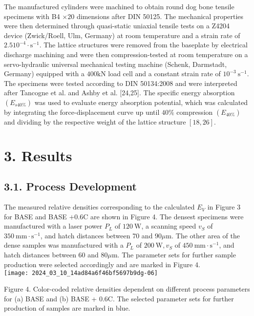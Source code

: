 \documentclass[10pt]{article}
\begin{document}
The manufactured cylinders were machined to obtain round dog bone tensile specimens with B4 $\times 20$ dimensions after DIN 50125. The mechanical properties were then determined through quasi-static uniaxial tensile tests on a Z4204 device (Zwick/Roell, Ulm, Germany) at room temperature and a strain rate of $2.510^{-4} \cdot \mathrm{s}^{-1}$. The lattice structures were removed from the baseplate by electrical discharge machining and were then compression-tested at room temperature on a servo-hydraulic universal mechanical testing machine (Schenk, Darmstadt, Germany) equipped with a $400 \mathrm{kN}$ load cell and a constant strain rate of $10^{-3} \mathrm{~s}^{-1}$. The specimens were tested according to DIN 50134:2008 and were interpreted after Tancogne et al. and Ashby et al. [24,25]. The specific energy absorption $\left(E_{s 40 \%}\right)$ was used to evaluate energy absorption potential, which was calculated by integrating the force-displacement curve up until $40 \%$ compression $\left(E_{40 \%}\right)$ and dividing by the respective weight of the lattice structure $[18,26]$.

\section*{3. Results}
\subsection*{3.1. Process Development}
The measured relative densities corresponding to the calculated $E_{V}$ in Figure 3 for BASE and BASE $+0.6 \mathrm{C}$ are shown in Figure 4. The densest specimens were manufactured with a laser power $P_{L}$ of $120 \mathrm{~W}$, a scanning speed $v_{S}$ of $350 \mathrm{~mm} \cdot \mathrm{s}^{-1}$, and hatch distances between 70 and $90 \mu \mathrm{m}$. The other area of the dense samples was manufactured with a $P_{L}$ of $200 \mathrm{~W}, v_{S}$ of $450 \mathrm{~mm} \cdot \mathrm{s}^{-1}$, and hatch distances between 60 and $80 \mu \mathrm{m}$. The parameter sets for further sample production were selected accordingly and are marked in Figure 4.\\
\texttt{[image: 2024\_03\_10\_14ad84a6f46bf5697b9dg-06]}

Figure 4. Color-coded relative densities dependent on different process parameters for (a) BASE and (b) BASE + 0.6C. The selected parameter sets for further production of samples are marked in blue.
\end{document}
